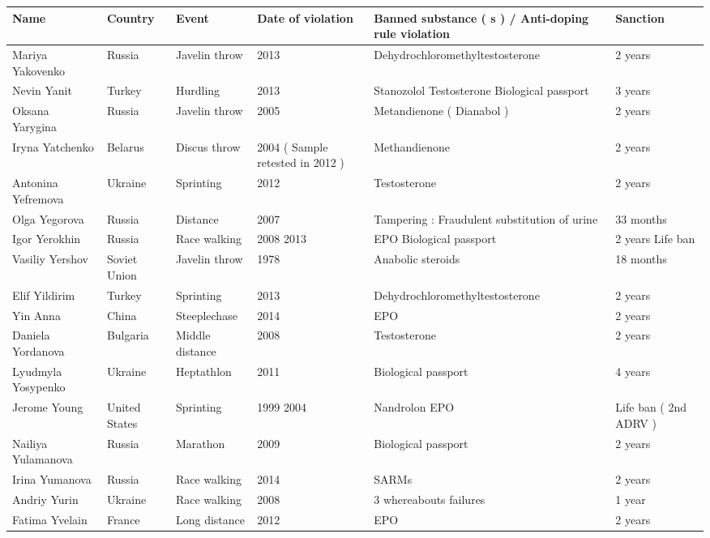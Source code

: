 \documentclass{article}
\begin{document}
\begin{tabular}{llllll}
\toprule
Name & Country & Event & Date of violation & Banned substance ( s ) / Anti-doping rule violation & Sanction \\
\midrule
Mariya Yakovenko & Russia & Javelin throw & 2013 & Dehydrochloromethyltestosterone & 2 years \\
Nevin Yanit & Turkey & Hurdling & 2013 & Stanozolol Testosterone Biological passport & 3 years \\
Oksana Yarygina & Russia & Javelin throw & 2005 & Metandienone ( Dianabol ) & 2 years \\
Iryna Yatchenko & Belarus & Discus throw & 2004 ( Sample retested in 2012 ) & Methandienone & 2 years \\
Antonina Yefremova & Ukraine & Sprinting & 2012 & Testosterone & 2 years \\
Olga Yegorova & Russia & Distance & 2007 & Tampering : Fraudulent substitution of urine & 33 months \\
Igor Yerokhin & Russia & Race walking & 2008 2013 & EPO Biological passport & 2 years Life ban \\
Vasiliy Yershov & Soviet Union & Javelin throw & 1978 & Anabolic steroids & 18 months \\
Elif Yildirim & Turkey & Sprinting & 2013 & Dehydrochloromethyltestosterone & 2 years \\
Yin Anna & China & Steeplechase & 2014 & EPO & 2 years \\
Daniela Yordanova & Bulgaria & Middle distance & 2008 & Testosterone & 2 years \\
Lyudmyla Yosypenko & Ukraine & Heptathlon & 2011 & Biological passport & 4 years \\
Jerome Young & United States & Sprinting & 1999 2004 & Nandrolon EPO & Life ban ( 2nd ADRV ) \\
Nailiya Yulamanova & Russia & Marathon & 2009 & Biological passport & 2 years \\
Irina Yumanova & Russia & Race walking & 2014 & SARMs & 2 years \\
Andriy Yurin & Ukraine & Race walking & 2008 & 3 whereabouts failures & 1 year \\
Fatima Yvelain & France & Long distance & 2012 & EPO & 2 years \\
\bottomrule
\end{tabular}
\end{document}
